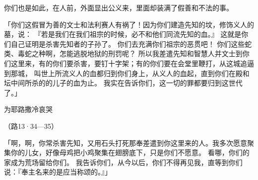 {你们也是如此，在人前，外面显出公义来，里面却装满了假善和不法的事。
\par }{\PP {}「你们这假冒为善的文士和法利赛人有祸了！因为你们建造先知的坟，修饰义人的墓，说：
『若是我们在我们祖宗的时候，必不和他们同流先知的血。』
这就是你们自己证明是杀害先知者的子孙了。
你们去充满你们祖宗的恶贯吧！
你们这些蛇类、毒蛇之种啊，怎能逃脱地狱的刑罚呢？
所以我差遣先知和智慧人并文士到你们这里来，有的你们要杀害，要钉十字架；有的你们要在会堂里鞭打，从这城追逼到那城，
叫世上所流义人的血都归到你们身上，从义人{}的血起，直到你们在殿和坛中间所杀的{}的儿子{}的血为止。
我实在告诉你们，这一切的罪都要归到这世代了。」
\par }{\SH 为耶路撒冷哀哭
\par }{\R （路13·34—35）
\par }{\PP {}「{}啊，{}啊，你常杀害先知，又用石头打死那奉差遣到你这里来的人。我多次愿意聚集你的儿女，好像母鸡把小鸡聚集在翅膀底下，只是你们不愿意。
看哪，你们的家成为荒场留给你们。
我告诉你们，从今以后，你们不得再见我，直等到你们说：『奉主名来的是应当称颂的。』」

}
